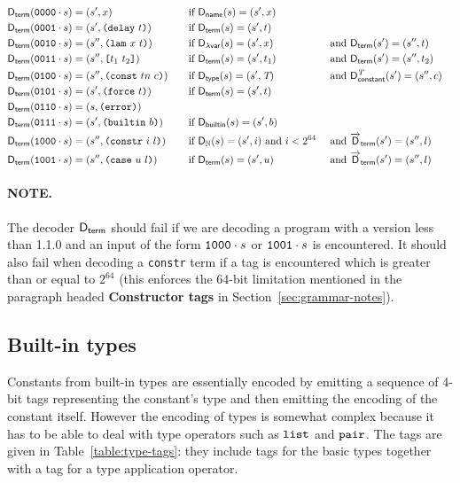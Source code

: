 \begin{alignat*}{5}
  \Dterm(\bits{0000} \cdot s)  &= (s', x) &&\quad \text{if } \Dname(s) = (s', x) \\
  \Dterm(\bits{0001} \cdot s)  &= (s', \Delay{t})  &&\quad \text{if}\ \Dterm(s) = (s', t) \\
  \Dterm(\bits{0010} \cdot s)  &= (s'', \Lam{x}{t})  &&\quad \text{if}\ \Dbinder(s) = (s', x)
                                                           &&\ \text{and}\ \Dterm(s') = (s'', t) \\
  \Dterm(\bits{0011} \cdot s)  &= (s'', \Apply{t_1}{t_2}) &&\quad \text{if}\ \Dterm(s) = (s', t_1)
                                                  &&\ \text{and}\ \Dterm(s') = (s'', t_2) \\
  \Dterm(\bits{0100} \cdot s)  &= (s'', \Const{tn}{c}) &&\quad \text{if}\ \Dtype(s) = (s', \tn)
                                                           &&\ \text{and}\ \dConstant{\tn}(s') =(s'', c) \\
  \Dterm(\bits{0101} \cdot s)  &= (s', \Force{t})  &&\quad \text{if}\ \Dterm(s) = (s', t) \\
  \Dterm(\bits{0110} \cdot s)  &= (s, \Error)  && \\
  \Dterm(\bits{0111} \cdot s)  &= (s', \Builtin{b}) &&\quad \text{if } \Dbuiltin(s) = (s', b) \\
  \Dterm(\bits{1000} \cdot s)  &= (s'', \Constr{i}{l}) &&\quad \text{if } \D_{\N}(s) = (s', i)\ \text{and}\ i < 2^{64} &&\ \text{and}\ \Dlist_{\mathsf{term}}(s') = (s'', l)\\
  \Dterm(\bits{1001} \cdot s)  &= (s'', \Kase{u}{l}) &&\quad \text{if } \Dterm(s) = (s', u) &&\ \text{and}\ \Dlist_{\mathsf{term}}(s') = (s'', l)
\end{alignat*}

\paragraph{NOTE.} The decoder $\mathsf{D}_{\mathsf{term}}$ should fail if we are decoding a program
with a version less than 1.1.0 and an input of the form $\mathtt{1000} \cdot s$ or
$\mathtt{1001} \cdot s$ is encountered.  It should also fail when decoding a
\texttt{constr} term if a tag is encountered which is greater than or equal to
$2^{64}$ (this enforces the 64-bit limitation mentioned in the paragraph headed
\textbf{Constructor tags} in Section~\ref{sec:grammar-notes}).

\subsection{Built-in types}
Constants from built-in types are essentially encoded by emitting a sequence of
4-bit tags representing the constant's type and then emitting the encoding of
the constant itself.  However the encoding of types is somewhat complex because
it has to be able to deal with type operators such as $\mathtt{list}$ and
$\mathtt{pair}$.  The tags are given in Table~\ref{table:type-tags}: they include
tags for the basic types together with a tag for a type application operator.

